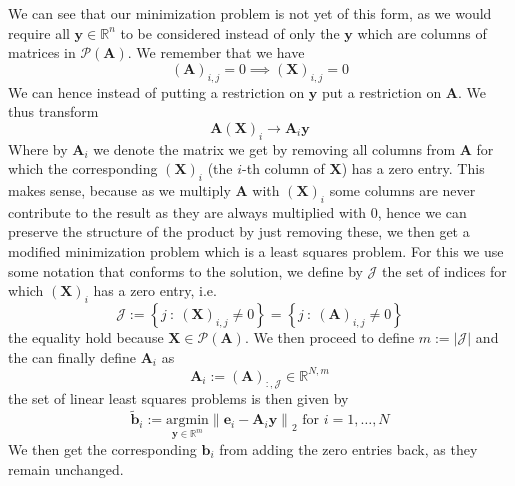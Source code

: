 \documentclass{article}
\begin{document}
\noindent We can see that our minimization problem is not yet of this form, as we would require all $\mathbf{y}\in \mathbb{R}^{n}$ to be considered instead of only the $\mathbf{y}$ which are columns of matrices in $\mathcal{P}\left(\mathbf{A}\right)$. We remember that we have
\begin{equation*}
    \left(\mathbf{A}\right)_{i,j} = 0 \implies \left(\mathbf{X}\right)_{i,j}  = 0
\end{equation*}
We can hence instead of putting a restriction on $\mathbf{y}$ put a restriction on $\mathbf{A}$. We thus transform
\begin{equation*}
    \mathbf{A}\left(\mathbf{X}\right)_{i}\longrightarrow \mathbf{A}_{i}\mathbf{y}
\end{equation*}
Where by $\mathbf{A}_{i}$ we denote the matrix we get by removing all columns from $\mathbf{A}$ for which 
 the corresponding $\left(\mathbf{X}\right)_{i}$ (the $i$-th column of $\mathbf{X}$) has a zero entry. This makes sense, because as we multiply $\mathbf{A}$ with $\left(\mathbf{X}\right)_{i}$ some columns are never contribute to the result as they are always multiplied with $0$, hence we can preserve the structure of the product by just removing these, we then get a modified minimization problem which is a least squares problem. For this we use some notation that conforms to the solution, we define by $\mathcal{J}$ the set of indices for which $\left(\mathbf{X}\right)_{i}$ has a zero entry, i.e.
 \begin{equation*}
     \mathcal{J} := \left\{j \::\:\left(\mathbf{X}\right)_{i, j} \neq 0 \right\} = \left\{j \::\:\left(\mathbf{A}\right)_{i, j} \neq 0 \right\}
 \end{equation*}
 the equality hold because $\mathbf{X}\in\mathcal{P}\left(\mathbf{A}\right)$. We then proceed to define $m := \left\lvert \mathcal{J}\right\rvert$ and the can finally define $\mathbf{A}_{i}$ as
 \begin{equation*}
     \mathbf{A}_{i} := \left(\mathbf{A}\right)_{:,\mathcal{J}} \in \mathbb{R}^{N,m}
 \end{equation*}
 the set of linear least squares problems is then given by
 \begin{equation*}
      \tilde{\mathbf{b}}_{i} := \underset{\mathbf{y}\in \mathbb{R}^{m}}{\text{argmin}}\left\lVert \mathbf{e}_{i} - \mathbf{A}_{i}\mathbf{y}\right\rVert_{2} \text{ for } i = 1, \dots , N
 \end{equation*}
 We then get the corresponding $\mathbf{b}_{i}$ from adding the zero entries back, as they remain unchanged.
\end{document}
